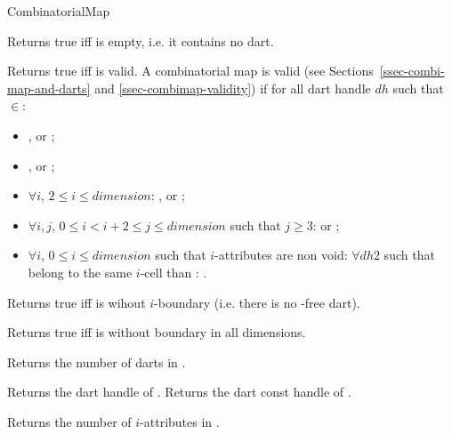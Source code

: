 \begin{ccRefConcept}{CombinatorialMap}

 {Returns true iff  is empty,
  i.e. it contains no dart.}

         {Returns true iff  is valid.}
A combinatorial map  is valid (see Sections~\ref{ssec-combi-map-and-darts} and \ref{ssec-combimap-validity}) if for all dart handle $dh$ such that 
 $\in$:\\
\begin{itemize}
\item {}, or ;
\item {}, or ;
\item $\forall i$, $2\leq i\leq dimension$: 
  , or ;
\item $\forall i, j$, $0\leq i<i+2\leq j\leq dimension$ such that $j\geq 3$:
   or
  ;
\item $\forall i$, $0\leq i\leq dimension$ such that $i$-attributes are non void:
   $\forall dh2$ such that  belong to the same $i$-cell than :
   .
 \end{itemize}

         {Returns true iff  is wihout $i$-boundary
          (i.e. there is no -free dart).
          }

         {Returns true iff  is without boundary in all dimensions.}

    {Returns the number of darts in .}

    {Returns the dart handle of .}
\ccGlue
{}
    {Returns the dart const handle of .}


   {Returns the number of $i$-attributes in . 
     }


\end{ccRefConcept}

